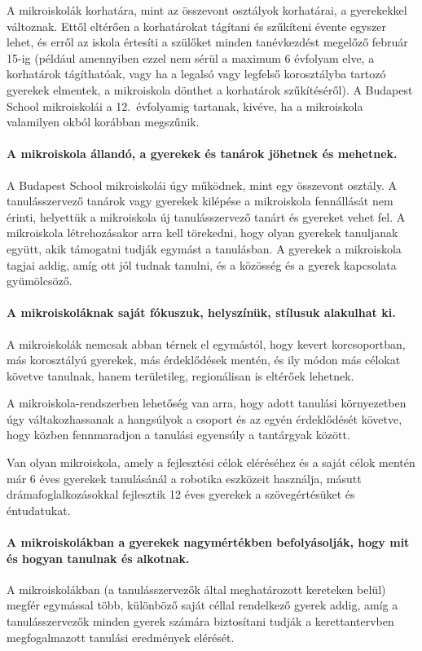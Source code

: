 A mikroiskolák korhatára, mint az összevont osztályok korhatárai, a gyerekekkel
változnak. Ettől eltérően a korhatárokat tágítani és szűkíteni évente egyszer
lehet, és
erről az iskola értesíti a szülőket minden tanévkezdést megelőző február 15-ig
(például amennyiben ezzel nem sérül a maximum 6 évfolyam elve, a korhatárok
tágíthatóak, vagy ha a legalsó vagy legfelső korosztályba tartozó gyerekek
elmentek, a mikroiskola dönthet a korhatárok szűkítéséről).
A Budapest School mikroiskolái a 12.~évfolyamig tartanak, kivéve, ha a
mikroiskola valamilyen okból korábban megszűnik.

\paragraph{A mikroiskola állandó, a gyerekek és tanárok jöhetnek és mehetnek.}
A Budapest School mikroiskolái úgy működnek, mint egy összevont osztály. A
tanulásszervező tanárok vagy gyerekek kilépése a mikroiskola fennállását nem
érinti, helyettük a mikroiskola új tanulásszervező tanárt és
gyereket vehet fel.  A mikroiskola létrehozásakor arra kell törekedni, hogy
olyan
gyerekek tanuljanak együtt, akik támogatni tudják egymást a tanulásban. A
gyerekek a mikroiskola tagjai addig, amíg ott jól tudnak tanulni, és a közösség
és a gyerek kapcsolata gyümölcsöző.

\paragraph{A mikroiskoláknak saját fókuszuk, helyszínük, stílusuk alakulhat
      ki.}
A mikroiskolák nemcsak abban térnek el egymástól, hogy kevert korcsoportban,
más korosztályú gyerekek, más érdeklődések mentén, és ily módon más célokat
követve tanulnak, hanem területileg, regionálisan is eltérőek lehetnek.

A mikroiskola-rendszerben lehetőség van arra, hogy adott tanulási környezetben
úgy váltakozhassanak a hangsúlyok a csoport és az egyén érdeklődését követve,
hogy közben
fennmaradjon a tanulási egyensúly a tantárgyak között.

Van olyan mikroiskola, amely a fejlesztési célok eléréséhez és a saját célok
mentén már 6 éves gyerekek tanulásánál a robotika eszközeit használja, másutt
drámafoglalkozásokkal fejlesztik 12 éves gyerekek a szövegértésüket és
éntudatukat.



\paragraph{A mikroiskolákban a gyerekek nagymértékben befolyásolják, hogy mit és
      hogyan
      tanulnak és alkotnak.}
A mikroiskolákban (a tanulásszervezők által meghatározott kereteken belül)
megfér egymással több, különböző saját céllal rendelkező gyerek addig, amíg a
tanulásszervezők minden gyerek számára biztosítani tudják a kerettantervben
megfogalmazott tanulási eredmények elérését.

